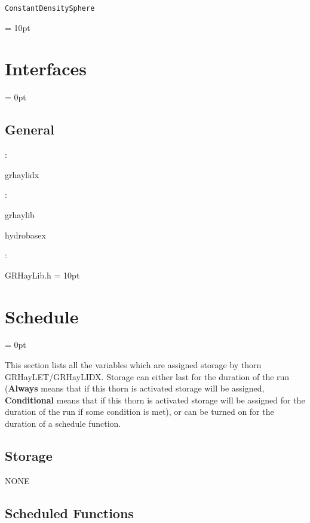 \documentclass{article}
\begin{document}
\vspace{0.5cm}\noindent {\bf [1]} \noindent \begin{verbatim}ConstantDensitySphere\end{verbatim}\parskip = 10pt 

\section{Interfaces} 


\parskip = 0pt

\vspace{3mm} \subsection*{General}

: 

grhaylidx
\vspace{2mm}

: 

grhaylib

hydrobasex
\vspace{2mm}

\vspace{5mm}

: 

GRHayLib.h
\vspace{2mm}\parskip = 10pt 

\section{Schedule} 


\parskip = 0pt


\noindent This section lists all the variables which are assigned storage by thorn GRHayLET/GRHayLIDX.  Storage can either last for the duration of the run ({\bf Always} means that if this thorn is activated storage will be assigned, {\bf Conditional} means that if this thorn is activated storage will be assigned for the duration of the run if some condition is met), or can be turned on for the duration of a schedule function.


\subsection*{Storage}NONE
\subsection*{Scheduled Functions}
\vspace{5mm}
\end{document}
